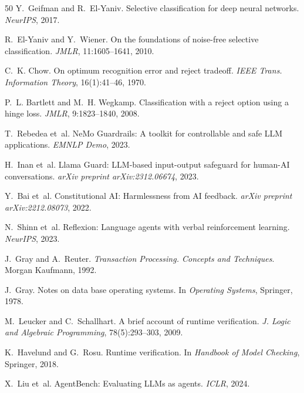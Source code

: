\documentclass[11pt]{book}
\begin{document}
\begin{thebibliography}{50}
Y.~Geifman and R.~El-Yaniv.
\newblock Selective classification for deep neural networks.
\newblock \emph{NeurIPS}, 2017.

R.~El-Yaniv and Y.~Wiener.
\newblock On the foundations of noise-free selective classification.
\newblock \emph{JMLR}, 11:1605--1641, 2010.

C.~K. Chow.
\newblock On optimum recognition error and reject tradeoff.
\newblock \emph{IEEE Trans. Information Theory}, 16(1):41--46, 1970.

P.~L. Bartlett and M.~H. Wegkamp.
\newblock Classification with a reject option using a hinge loss.
\newblock \emph{JMLR}, 9:1823--1840, 2008.

T.~Rebedea et~al.
\newblock NeMo Guardrails: A toolkit for controllable and safe LLM applications.
\newblock \emph{EMNLP Demo}, 2023.

H.~Inan et~al.
\newblock Llama Guard: LLM-based input-output safeguard for human-AI conversations.
\newblock \emph{arXiv preprint arXiv:2312.06674}, 2023.

Y.~Bai et~al.
\newblock Constitutional AI: Harmlessness from AI feedback.
\newblock \emph{arXiv preprint arXiv:2212.08073}, 2022.

N.~Shinn et~al.
\newblock Reflexion: Language agents with verbal reinforcement learning.
\newblock \emph{NeurIPS}, 2023.

J.~Gray and A.~Reuter.
\newblock \emph{Transaction Processing. Concepts and Techniques}.
\newblock Morgan Kaufmann, 1992.

J.~Gray.
\newblock Notes on data base operating systems.
\newblock In \emph{Operating Systems}, Springer, 1978.

M.~Leucker and C.~Schallhart.
\newblock A brief account of runtime verification.
\newblock \emph{J. Logic and Algebraic Programming}, 78(5):293--303, 2009.

K.~Havelund and G.~Rosu.
\newblock Runtime verification.
\newblock In \emph{Handbook of Model Checking}, Springer, 2018.

X.~Liu et~al.
\newblock AgentBench: Evaluating LLMs as agents.
\newblock \emph{ICLR}, 2024.


\end{thebibliography}
\end{document}
